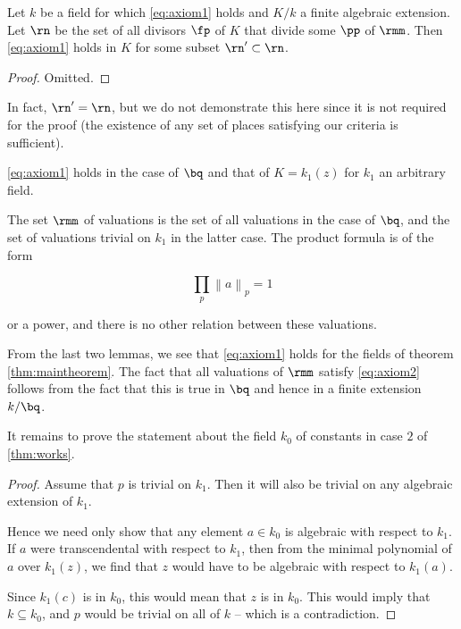 \begin{lemma}
  Let $k$ be a field for which \ref{eq:axiom1} holds and $K/k$ a finite algebraic
  extension. Let $\rn$ be the set of all divisors $\fp$ of $K$ that divide some
  $\pp$ of $\rmm$. Then \ref{eq:axiom1} holds in $K$ for some subset $\rn' \subset \rn$.
\end{lemma}

\begin{proof}
  Omitted.
\end{proof}

In fact, $\rn' = \rn$, but we do not demonstrate this here since it is not
required for the proof (the existence of any set of places satisfying our
criteria is sufficient).

\begin{lemma}
  \ref{eq:axiom1} holds in the case of $\bq$ and that of $K=k_1(z)$ for $k_1$ an
  arbitrary field.
\end{lemma}

The set $\rmm$ of valuations is the set of all valuations in the case of
$\bq$, and the set of valuations trivial on $k_1$ in the latter case. The
product formula is of the form

\[ \prod_p {\left\lVert a \right\rVert}_p = 1 \]

or a power, and there is no other relation between these valuations.

From the last two lemmas, we see that \ref{eq:axiom1} holds for the fields of
theorem \ref{thm:maintheorem}. The fact that all valuations of $\rmm$ satisfy
\ref{eq:axiom2} follows from the fact that this is true in $\bq$ and hence in a
finite extension $k/\bq$.

It remains to prove the statement about the field $k_0$ of constants in case $2$
of \ref{thm:works}.

\begin{proof}
  Assume that $p$ is trivial on $k_1$. Then it will also be trivial on any
  algebraic extension of $k_1$.

  Hence we need only show that any element $a \in k_0$ is algebraic with respect
  to $k_1$. If $a$ were transcendental with respect to $k_1$, then from the
  minimal polynomial of $a$ over $k_1(z)$, we find that $z$ would have to be
  algebraic with respect to $k_1(a)$.

  Since $k_1(c)$ is in $k_0$, this would mean that $z$ is in $k_0$. This would
  imply that $k\subseteq k_0$, and $p$ would be trivial on all of $k$ -- which
  is a contradiction.
\end{proof}

